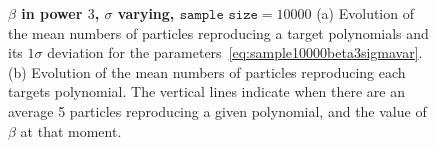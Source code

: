 \documentclass[11pt]{article}
\begin{document}
\begin{enumerate}
	  \begin{figure}[h!]
	  	\centering
	  	\caption{{\bfseries \boldmath $\beta$ in power $3$, $\sigma$ varying, $\texttt{sample size} = 10000$} (a) Evolution of the mean numbers of particles reproducing a target polynomials and its $1\sigma$ deviation for the parameters~\eqref{eq:sample10000beta3sigmavar}. (b) Evolution of the mean numbers of particles reproducing each targets polynomial. The vertical lines indicate when there are an average 5 particles reproducing a given polynomial, and the value of $\beta$ at that moment.}
	  	\label{fig:sample10000beta3sigmavar}
	  \end{figure}


\end{enumerate}
\end{document}

